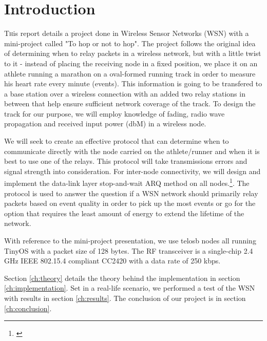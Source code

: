\section{Introduction}\label{ch:introduction}

\lettrine[nindent=0em,lines=3]{T} his report details a project done in Wireless Sensor Networks (WSN) with a mini-project called "To hop or not to hop". The project follows the original idea of determining when to relay packets in a wireless network, but with a little twist to it - instead of placing the receiving node in a fixed position, we place it on an athlete running a marathon on a oval-formed running track in order to measure his heart rate every minute (events). This information is going to be transfered to a base station over a wireless connection with an added two relay stations in between that help ensure sufficient network coverage of the track. To design the track for our purpose, we will employ knowledge of fading, radio wave propagation and received input power (dbM) in a wireless node.

\noindent We will seek to create an effective protocol that can determine when to communicate directly with the node carried on the athlete/runner and when it is best to use one of the relays. This protocol will take transmissions errors and signal strength into consideration. For inter-node connectivity, we will design and implement the data-link layer stop-and-wait ARQ method on all nodes.\footnote{\cite{Ieee}}. The protocol is used to answer the question if a WSN network should primarily relay packets based on event quality in order to pick up the most events or go for the option that requires the least amount of energy to extend the lifetime of the network.

\noindent With reference to the mini-project presentation, we use telosb nodes all running TinyOS with a packet size of 128 bytes. The RF transceiver is a single-chip 2.4 GHz IEEE 802.15.4 compliant CC2420 with a data rate of 250 kbps.

\noindent Section \ref{ch:theory} details the theory behind the implementation in section \ref{ch:implementation}. Set in a real-life scenario, we performed a test of the WSN with results in section \ref{ch:results}. The conclusion of our project is in section \ref{ch:conclusion}.

